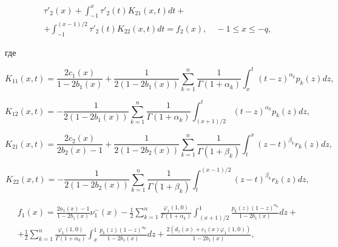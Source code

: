 \begin{multline}

{\tau '_2}(x) +  \int _{ - 1}^x {{\tau '_2}(t){K_{21}}(x,t)dt}  + \\ 

+ \int _{ - 1}^{({{x - 1}})/{2}} {{\tau '_2}(t){K_{22}}(x,t)dt}  = f_2(x),\quad      - 1 \le x \le  - q, \label{eq:22.2}

\end{multline}

где

\begin{equation}

{K_{11}}(x,t) = \frac{{2{c_1}(x)}}{{1 - 2{b_1}(x)}} + \frac{1}{{2\left( {1 - 2{b_1}(x)} \right)}}\sum\limits_{k = 1}^n {\frac{1}{{\Gamma (1 + {\alpha _k})}} \int _x^t {{{(t - z)}^{{\alpha _k}}}{p_k}(z)dz} },\label{eq:23.1}

\end{equation}

\begin{equation}

{K_{12}}(x,t) =  - \frac{1}{{2\left( {1 - 2{b_1}(x)} \right)}}\sum\limits_{k = 1}^n {\frac{1}{{\Gamma (1 + {\alpha _k})}} \int _{({{x + 1}})/{2}}^t {{{(t - z)}^{{\alpha _k}}}{p_k}(z)dz} }, \label{eq:23.2}

\end{equation}

\begin{equation}

{K_{21}}(x,t) = \frac{{2{c_2}(x)}}{{2{b_2}(x) - 1}} + \frac{1}{{2\left( {1 - 2{b_2}(x)} \right)}}\sum\limits_{k = 1}^n {\frac{1}{{\Gamma (1 + {\beta _k})}} \int _t^x {{{(z - t)}^{{\beta _k}}}{r_k}(z)dz} }, \label{eq:24.1}

\end{equation}

\begin{equation}

{K_{22}}(x,t) =  - \frac{1}{{2\left( {1 - 2{b_2}(x)} \right)}}\sum\limits_{k = 1}^n {\frac{1}{{\Gamma (1 + {\beta _k})}} \int _t^{({{x - 1}})/{2}} {{{(z - t)}^{{\beta _k}}}{r_k}(z)dz} }, \label{eq:24.2}

\end{equation}

\begin{multline}

{f_1}(x) = \frac{{2{a_1}(x) - 1}}{{1 - 2{b_1}(x)}}\nu _1^ - (x) - \frac{1}{2}\sum\limits_{k = 1}^n {\frac{{{\varphi _1}(1, 0)}}{{\Gamma (1 + {\alpha _k})}} \int _{({{x + 1}})/{2}}^1 {\frac{{{p_k}(z){{(1 - z)}^{{\alpha _k}}}}}{{1 - 2{b_1}(x)}}dz} }  + 

\\

+ \frac{1}{2}\sum\limits_{k = 1}^n {\frac{{{\varphi _1}(1, 0)}}{{\Gamma (1 + {\alpha _k})}} \int _x^1 {\frac{{{p_k}(z){{(1 - z)}^{{\alpha _k}}}}}{{1 - 2{b_1}(x)}}dz} }  + \frac{{2({d_1}(x) + {c_1}(x){\varphi _1}(1, 0))}}{{1 - 2{b_1}(x)}}, \label{eq:25.1}

\end{multline}

